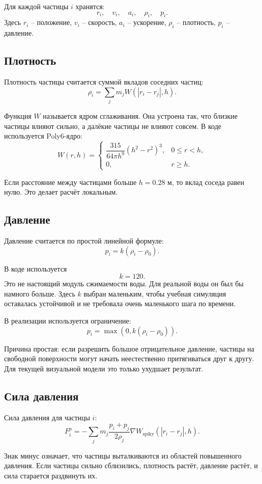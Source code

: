 \documentclass[12pt,a4paper]{article}
\begin{document}
Для каждой частицы \(i\) хранятся:
\[
r_i, \quad v_i, \quad a_i, \quad \rho_i, \quad p_i.
\]
Здесь \(r_i\) -- положение, \(v_i\) -- скорость, \(a_i\) -- ускорение,
\(\rho_i\) -- плотность, \(p_i\) -- давление.

\subsection{Плотность}

Плотность частицы считается суммой вкладов соседних частиц:
\[
\rho_i = \sum_j m_j W(|r_i-r_j|, h).
\]

Функция \(W\) называется ядром сглаживания. Она устроена так, что близкие
частицы влияют сильно, а далёкие частицы не влияют совсем. В коде используется
Poly6-ядро:
\[
W(r,h)=
\begin{cases}
\dfrac{315}{64\pi h^9}(h^2-r^2)^3, & 0 \le r < h,\\
0, & r \ge h.
\end{cases}
\]

Если расстояние между частицами больше \(h=0.28\) м, то вклад соседа равен
нулю. Это делает расчёт локальным.

\subsection{Давление}

Давление считается по простой линейной формуле:
\[
p_i = k(\rho_i-\rho_0).
\]

В коде используется
\[
k = 120.
\]
Это не настоящий модуль сжимаемости воды. Для реальной воды он был бы намного
больше. Здесь \(k\) выбран маленьким, чтобы учебная симуляция оставалась
устойчивой и не требовала очень маленького шага по времени.

В реализации используется ограничение:
\[
p_i = \max(0, k(\rho_i-\rho_0)).
\]

Причина простая: если разрешить большое отрицательное давление, частицы на
свободной поверхности могут начать неестественно притягиваться друг к другу.
Для текущей визуальной модели это только ухудшает результат.

\subsection{Сила давления}

Сила давления для частицы \(i\):
\[
F_i^{p} =
- \sum_j m_j
\frac{p_i+p_j}{2\rho_j}
\nabla W_{\text{spiky}}(|r_i-r_j|,h).
\]

Знак минус означает, что частицы выталкиваются из областей повышенного давления.
Если частицы сильно сблизились, плотность растёт, давление растёт, и сила
старается раздвинуть их.
\end{document}
